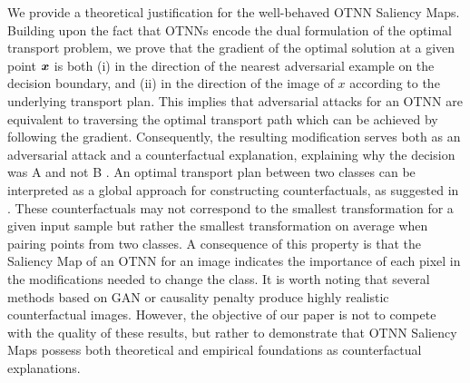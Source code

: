 We provide a theoretical justification for the well-behaved OTNN Saliency Maps. Building upon the fact that OTNNs encode the dual formulation of the optimal transport problem, we prove that the gradient of the optimal solution at a given point $\bm{x}$ is both (i) in the direction of the nearest adversarial example on the decision boundary, and (ii) in the direction of the image of $x$ according to the underlying transport plan. This implies that adversarial attacks for an OTNN are equivalent to traversing the optimal transport path which can be achieved  by following the gradient. Consequently, the resulting modification serves both as an adversarial attack and a counterfactual explanation, 
explaining why the decision was A and not B
\cite{Lewis1973}. An optimal transport plan between two classes can be interpreted as a global approach for constructing counterfactuals, as suggested in \cite{black19OptimTransp,deLara2021}. These counterfactuals may not correspond to the smallest transformation for a given input sample but rather the smallest transformation on average when pairing points from two classes. A consequence of this property is that the Saliency Map of an OTNN for an image indicates the importance of each pixel in the modifications needed to change the class. It is worth noting that several methods based on GAN \cite{Jacob2021} or causality penalty \cite{karimi2021algorithmic} produce highly realistic counterfactual images. %
However, the objective of our paper is not to compete with the quality of these results, but rather to demonstrate that OTNN Saliency Maps possess both theoretical and empirical foundations as counterfactual explanations.


